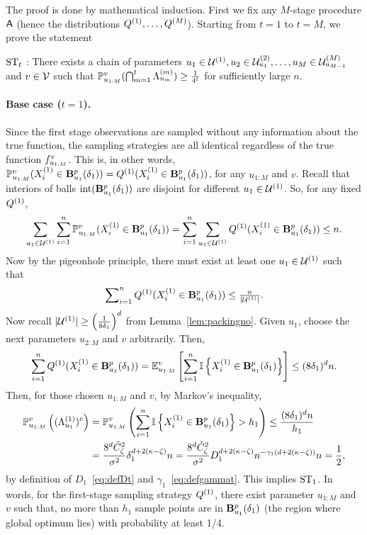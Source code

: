 The proof is done by mathematical induction. 
First we fix any $M$-stage procedure $\mathsf{A}$ (hence the distributions $Q^{({1})}, \dots, Q^{({M})}$).
Starting from $t = 1$ to $t = M$, we prove the statement 
\begin{displayquote}
	$\textup{ST}_t$ : There exists a chain of parameters $u_1 \in \mathcal{U}^{(1)}, u_2 \in \mathcal{U}^{({2})}_{u_{1}}, \dots, u_M \in \mathcal{U}^{({M})}_{u_{M-1}}$ and $v \in \mathcal{V}$ such that $\mathbb{P}_{u_{1:M}}^v (\bigcap_{m=1}^t \Lambda_{u_{m}}^{({m})} ) \geq \frac{1}{4^{t}}$ for sufficiently large $n$.
\end{displayquote}

\paragraph{Base case ($t=1$).}
Since the first stage observations are sampled without any information about the true function, the sampling strategies are all identical regardless of the true function $f_{u_{1:M}}^v$.
This is, in other words, $\mathbb{P}_{u_{1:M}}^v(X_{i}^{(1)}\in \mathbf{B}^p_{u_{1}}({\delta_{1}})) = Q^{({1})}(X_{i}^{(1)}\in \mathbf{B}^p_{u_{1}}({\delta_{1}}))$, 
for any $u_{1:M}$ and $v$.
Recall that interiors of balls $\interior(\Bpone)$ are disjoint for different $u_1 \in \mathcal{U}^{(1)}$.
So, for any fixed $Q^{({1})}$,
\begin{equation}
\label{eq:smallthann}
\sum_{u_1 \in \mathcal{U}^{(1)}} \sum_{i=1}^n \mathbb{P}_{u_{1:M}}^v(X_{i}^{(1)}\in \mathbf{B}^p_{u_{1}}({\delta_{1}}))
=\sum_{i=1}^n \sum_{u_1 \in \mathcal{U}^{(1)}} Q^{({1})}(X_{i}^{(1)}\in \mathbf{B}^p_{u_{1}}({\delta_{1}})) \leq n.
\end{equation}
Now by the pigeonhole principle, there must exist at least one $u_1 \in \mathcal{U}^{(1)}$ such that 
\begin{equation*}
	\sum\nolimits_{i=1}^n Q^{({1})}(X_{i}^{(1)}\in \mathbf{B}^p_{u_{1}}({\delta_{1}})) \leq \tfrac{n}{| \mathcal{U}^{(1)} |}.
\end{equation*}
Now recall $| \mathcal{U}^{(1)} | \geq \left( \frac{1}{8\delta_1} \right )^d$ from Lemma~\ref{lem:packingno}.
Given $u_1$, choose the next parameters $u_{2:M}$ and $v$ arbitrarily. Then,
\begin{equation*}
	\sum_{i=1}^n Q^{({1})}(X_{i}^{(1)}\in \mathbf{B}^p_{u_{1}}({\delta_{1}})) = \mathbb{E}_{u_{1:M}}^v \left [\sum_{i=1}^n \mathbb{I}\left\{{ X_{i}^{(1)}\in \mathbf{B}^p_{u_{1}}({\delta_{1}}) }\right\} \right ] \leq (8\delta_1)^d n.
\end{equation*}
Then, for those chosen $u_{1:M}$ and $v$, by Markov's inequality,
\begin{align*}
	\mathbb{P}_{u_{1:M}}^v \left ((\Lambda_{u_{1}}^{({1})})^c \right ) 
	&= \mathbb{P}_{u_{1:M}}^v \left (\sum_{i=1}^n \mathbb{I}\left\{{ X_{i}^{(1)}\in \mathbf{B}^p_{u_{1}}({\delta_{1}}) }\right\} > h_1 \right ) 
	\leq \frac{(8 \delta_1)^d n}{h_1} \\
	&= \frac{8^d \tilde C_\zeta^2}{\sigma^2}\delta_1^{d+2(\kappa-\zeta)} n
	= \frac{8^d \tilde C_\zeta^2}{\sigma^2} D_1^{d+2(\kappa-\zeta)} n^{-\gamma_1(d+2(\kappa-\zeta))} n
	= \frac{1}{2},
\end{align*}
by definition of $D_1$~\eqref{eq:defDt} and $\gamma_1$~\eqref{eq:defgammat}.
This implies $\textup{ST}_1$.
In words, for the first-stage sampling strategy $Q^{({1})}$, there exist parameter $u_{1:M}$ and $v$ such that,
no more than $h_1$ sample points are in $\mathbf{B}^p_{u_{1}}({\delta_{1}})$ (the region where global optimum lies) with probability at least 1/4.

